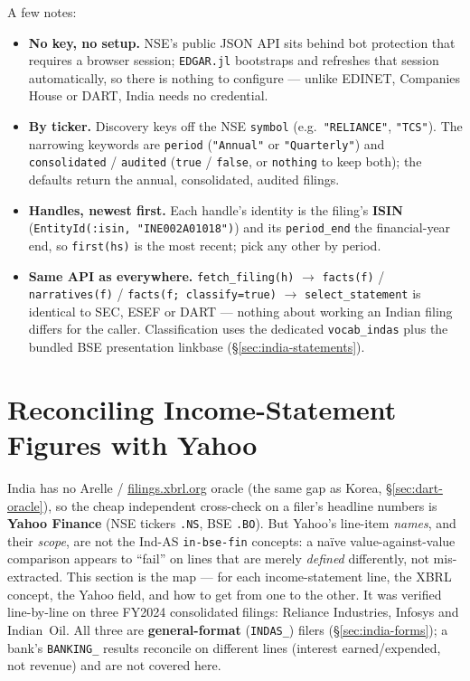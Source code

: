 \documentclass[11pt,a4paper]{report}
\begin{document}
\noindent A few notes:

\begin{itemize}
  \item \textbf{No key, no setup.} NSE's public JSON API sits behind bot protection that requires a browser
    session; \texttt{EDGAR.jl} bootstraps and refreshes that session automatically, so there is nothing to
    configure --- unlike EDINET, Companies House or DART, India needs no credential.
  \item \textbf{By ticker.} Discovery keys off the NSE \texttt{symbol} (e.g.\ \texttt{"RELIANCE"},
    \texttt{"TCS"}). The narrowing keywords are \texttt{period} (\texttt{"Annual"} or \texttt{"Quarterly"})
    and \texttt{consolidated} / \texttt{audited} (\texttt{true} / \texttt{false}, or \texttt{nothing} to
    keep both); the defaults return the annual, consolidated, audited filings.
  \item \textbf{Handles, newest first.} Each handle's identity is the filing's \textbf{ISIN}
    (\texttt{EntityId(:isin,\ "INE002A01018")}) and its \texttt{period\_end} the financial-year end, so
    \texttt{first(hs)} is the most recent; pick any other by period.
  \item \textbf{Same API as everywhere.} \texttt{fetch\_filing(h)} $\to$ \texttt{facts(f)} /
    \texttt{narratives(f)} / \texttt{facts(f;\ classify=true)} $\to$ \texttt{select\_statement} is identical
    to SEC, ESEF or DART --- nothing about working an Indian filing differs for the caller. Classification
    uses the dedicated \texttt{vocab\_indas} plus the bundled BSE presentation linkbase
    (\S\ref{sec:india-statements}).
\end{itemize}

\section{Reconciling Income-Statement Figures with Yahoo}\label{sec:india-yahoo}

India has no Arelle / \href{https://filings.xbrl.org}{filings.xbrl.org} oracle (the same gap as Korea,
\S\ref{sec:dart-oracle}), so the cheap independent cross-check on a filer's headline numbers is
\textbf{Yahoo Finance} (NSE tickers \texttt{.NS}, BSE \texttt{.BO}). But Yahoo's line-item \emph{names}, and
their \emph{scope}, are not the Ind-AS \texttt{in-bse-fin} concepts: a na\"ive value-against-value
comparison appears to ``fail'' on lines that are merely \emph{defined} differently, not mis-extracted. This
section is the map --- for each income-statement line, the XBRL concept, the Yahoo field, and how to get
from one to the other. It was verified line-by-line on three FY2024 consolidated filings: Reliance
Industries, Infosys and Indian~Oil. All three are \textbf{general-format} (\texttt{INDAS\_}) filers
(\S\ref{sec:india-forms}); a bank's \texttt{BANKING\_} results reconcile on different lines (interest
earned/expended, not revenue) and are not covered here.
\end{document}
